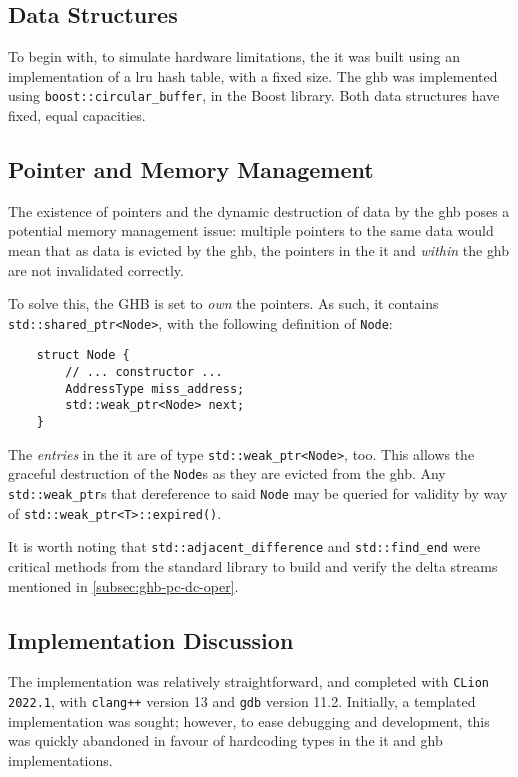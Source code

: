 \documentclass[multicol,date,tikzlibs,minted,ieeebib,bibtex]{epreport}
\begin{document}
\begin{multicols}{2}
	\subsection{Data Structures}
	To begin with, to simulate hardware limitations, the \gls{it} was built using an implementation of a \gls{lru} hash table, with a fixed size.
	The \gls{ghb} was implemented using \texttt{boost::circular_buffer}, in the Boost library.
	Both data structures have fixed, equal capacities.

	\subsection{Pointer and Memory Management}
	The existence of pointers and the dynamic destruction of data by the \gls{ghb} poses a potential memory management issue: multiple pointers to the same data would mean that as data is evicted by the \gls{ghb}, the pointers in the \gls{it} and \emph{within} the \gls{ghb} are not invalidated correctly.

	To solve this, the GHB is set to \emph{own} the pointers.
	As such, it contains \texttt{std::shared_ptr<Node>}, with the following definition of \texttt{Node}:
	\begin{verbatim}
	struct Node {
		// ... constructor ...
		AddressType miss_address;
		std::weak_ptr<Node> next;
	}
	\end{verbatim}
	The \emph{entries} in the \gls{it} are of type \texttt{std::weak_ptr<Node>}, too.
	This allows the graceful destruction of the \texttt{Node}s as they are evicted from the \gls{ghb}.
	Any \texttt{std::weak_ptr}s that dereference to said \texttt{Node} may be queried for validity by way of \texttt{std::weak_ptr<T>::expired()}.

	It is worth noting that \texttt{std::adjacent_difference} and \texttt{std::find_end} were critical methods from the \Cpp{} standard library to build and verify the delta streams mentioned in \cref{subsec:ghb-pc-dc-oper}.

	\subsection{Implementation Discussion}
	The implementation was relatively straightforward, and completed with \texttt{CLion 2022.1}, with \texttt{clang++} version 13 and \texttt{gdb} version 11.2.
	Initially, a templated implementation was sought; however, to ease debugging and development, this was quickly abandoned in favour of hardcoding types in the \gls{it} and \gls{ghb} implementations.


\end{multicols}
\end{document}
